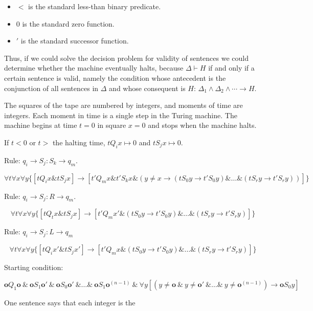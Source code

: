 \documentclass{article}
\theoremstyle{definition}
\theoremstyle{definition}
\begin{document}
\begin{enumerate}
\begin{itemize}
\item $<$ is the standard less-than binary predicate.

\item $0$ is the standard zero function.

\item $'$ is the standard successor function.

\end{itemize}

Thus, if we could solve the decision problem for validity of sentences we could determine whether the machine eventually halts, because $\Delta\vdash H$ if and only if a certain sentence is valid, namely the condition whose antecedent is the conjunction of all sentences in $\Delta$ and whose consequent is $H$: $\Delta_1 \wedge \Delta_2 \wedge \cdots \rightarrow H$.

The squares of the tape are numbered by integers, and moments of time are integers. Each moment in time is a single step in the Turing machine. The machine begins at time $t=0$ in square $x=0$ and stops when the machine halts. 

If $t<0$ or $t>$ the halting time, $tQ_ix \mapsto 0$ and $tS_jx\mapsto 0$.

Rule: $q_i \rightarrow S_j:S_k \rightarrow q_m$.

\[\forall t\forall x\forall y \{[tQ_ix\& tS_jx] \rightarrow [t'Q_mx\& t'S_kx \& (y\ne x \rightarrow (tS_0y\rightarrow t'S_0y)\&\dots\&(tS_ry\rightarrow t'S_ry))]\}\]

Rule: $q_i\rightarrow S_j:R\rightarrow q_m$.

\[\forall t\forall x\forall y\{[tQ_tx\&tS_jx]\rightarrow [t'Q_mx' \& (tS_0y\rightarrow t'S_0y)\&\dots\&(tS_ry\rightarrow t'S_ry)]\}\]

Rule: $q_i\rightarrow S_j:L \rightarrow q_m$

\[\forall t \forall x \forall y \{[tQ_ix' \& tS_jx']\rightarrow [t'Q_mx\& (tS_0y\rightarrow t'S_0y)\&\dots\&(tS_ry\rightarrow t'S_ry)]\}\]

Starting condition:

\newcommand{\z}{\mathbf{o}}

\[\z Q_1 \z\ \&\ \z S_1\z'\ \&\ \z S_0\z '\ \&\dots\&\ \z S_1\z^{(n-1)}\ \&\ \forall y [(y\ne \z\ \&\ y\ne \z'\ \&\dots\&\ y\ne \z^{(n-1)}) \rightarrow \z S_0y]\]

One sentence says that each integer is the 

\end{enumerate}
\end{document}
